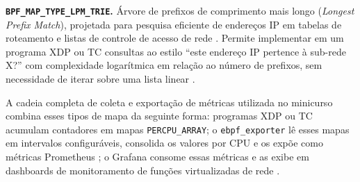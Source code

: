 \textbf{\texttt{BPF\_MAP\_TYPE\_LPM\_TRIE}.}
Árvore de prefixos de comprimento mais longo (\textit{Longest Prefix Match}),
projetada para pesquisa eficiente de endereços IP em tabelas de roteamento e
listas de controle de acesso de rede \cite{linuxkernel2024}.
Permite implementar em um programa XDP ou TC consultas ao estilo ``este endereço
IP pertence à sub-rede X?'' com complexidade logarítmica em relação ao número de
prefixos, sem necessidade de iterar sobre uma lista linear \cite{gregg2019}.

A cadeia completa de coleta e exportação de métricas utilizada no minicurso combina
esses tipos de mapa da seguinte forma: programas XDP ou TC acumulam contadores em
mapas \texttt{PERCPU\_ARRAY}; o \texttt{ebpf\_exporter} \cite{ebpfexporter} lê
esses mapas em intervalos configuráveis, consolida os valores por CPU e os expõe
como métricas Prometheus \cite{prometheusdocs}; o Grafana \cite{grafanadocs}
consome essas métricas e as exibe em dashboards de monitoramento de funções
virtualizadas de rede \cite{alves2026tcc}.